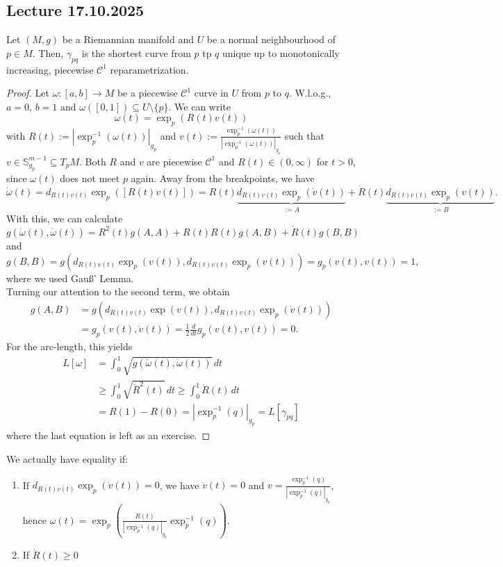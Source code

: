 \subsection{Lecture 17.10.2025}

\begin{theorem}
    Let $(M,g)$ be a Riemannian manifold and $U$ be a normal neighbourhood of $p \in M$. Then, $\gamma_{pq}$ is the shortest curve from $p$ tp $q$ unique up to monotonically increasing, piecewise $\mathcal{C}^1$ reparametrization.
\end{theorem}
\begin{proof}
    Let $\omega: [a,b] \to M$ be a piecewise $\mathcal{C}^1$ curve in $U$ from $p$ to $q$. W.l.o.g., $a=0$, $b=1$ and $\omega([0,1]) \subseteq U \setminus \{p\}$. We can write \[
    \omega(t)= \exp_p(R(t)v(t))
\] with $R(t):=|\exp_p^{-1}(\omega(t))|_{g_p}$ and $v(t):= \frac{\exp_p^{-1}(\omega(t))}{|\exp_p^{-1}(\omega(t))|_{g_p}}$ such that $v \in \mathbb{S}^{m-1}_{g_p} \subseteq T_pM$. Both $R$ and $v$ are piecewise $\mathcal{C}^1$ and $R(t) \in (0, \infty)$ for $t > 0$, since $\omega(t)$ does not meet $p$ again. Away from the breakpoints, we have \[
\dot{\omega}(t)= d_{R(t)v(t)}\exp_p([R(t)v(t)])=R(t) \underbrace{d_{R(t)v(t)}\exp_p(\dot{v}(t))}_{:=A} + \dot{R}(t)\underbrace{d_{R(t)v(t)}\exp_p(v(t))}_{:=B}
.\]  With this, we can calculate \[
g(\dot{\omega}(t),\dot{\omega}(t))=R^2(t)g(A,A)+R(t)\dot{R}(t)g(A,B)+ \dot{R}(t)g(B,B)
\] and \[
g(B,B)= g(d_{R(t)v(t)}\exp_p(v(t)),d_{R(t)v(t)}\exp_p(v(t))) = g_p(v(t),v(t))=1
,\] where we used Gauß' Lemma.\\
Turning our attention to the second term, we obtain 
\begin{align*}
    g(A,B) &= g(d_{R(t)v(t)}\exp(v(t)),d_{R(t)v(t)}\exp_p(\dot{v}(t))) \\
           &= g_p(v(t),\dot{v}(t))=\frac{1}{2}\frac{d}{dt} g_p(v(t),v(t))=0.
\end{align*}
For the arc-length, this yields
\begin{align}
    L[\omega] &= \int_0^1 \sqrt{g(\dot{\omega}(t), \dot{\omega}(t))} \, dt \\
              &\geq \int_0^1 \sqrt{\dot{R}^2(t)} \, dt \geq \int_0^1 \dot{R}(t) \, dt \\
              &= R(1)-R(0) = |\exp_p^{-1}(q)|_{g_p} = L[\gamma_{pq}]
\end{align} where the last equation is left as an exercise.
\end{proof}
\begin{remark}
    We actually have equality if:
    \begin{enumerate}
        \item If $d_{R(t)v(t)}\exp_p(\dot{v}(t))=0$, we have $\dot{v}(t)=0$ and $v=\frac{\exp_p^{-1}(q)}{|\exp_p^{-1}(q)|_{g_p}}$, hence $\omega(t)=\exp_p \left(\frac{R(t)}{|\exp_p^{-1}(q)|_{g_p}}\exp_p^{-1}(q) \right)$.
        \item If $\dot{R}(t)\geq 0$
    \end{enumerate}
\end{remark}
